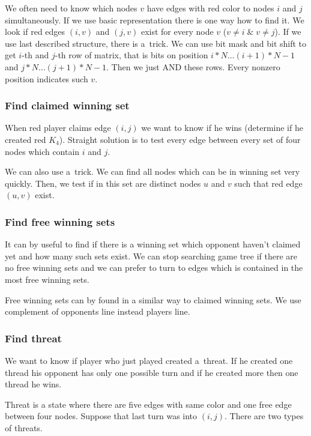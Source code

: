 We often need to know which nodes $v$ have edges with red color to nodes $i$
and $j$ simultaneously. If we use basic representation there is one way how to
find it. We look if red edges $(i,v)$ and $(j,v)$ exist for every node $v$ ($v
\ne i \; \& \; v \ne j$). If we use last described structure, there is a~trick.
We can use bit mask and bit shift to get $i$-th and $j$-th row of matrix, that
is bits on position $i*N \ldots (i\!+\!1)\!*\!N\!-\!1$ and $j*N \ldots
(j\!+\!1)\!*\!N\!-\!1 $. Then we just AND these rows. Every nonzero position
indicates such $v$.

\subsubsection{ Find claimed winning set } 

When red player claims edge $(i,j)$ we want to know if he wins (determine if he
created red $K_4$). Straight solution is to test every edge between every set
of four nodes which contain $i$ and $j$.

We can also use a~trick. We can find all nodes which can be in winning set very
quickly. Then, we test if in this set are distinct nodes $u$ and $v$ such that
red edge $(u,v)$ exist.


\subsubsection{ Find free winning sets }

It can by useful to find if there is a winning set which opponent haven't
claimed yet and how many such sets exist. We can stop searching game tree if
there are no free winning sets and we can prefer to turn to edges which is
contained in the most free winning sets.

Free winning sets can by found in a similar way to claimed winning sets. We use
complement of opponents line instead players line.

\subsubsection{ Find threat }

We want to know if player who just played created a~threat. If he created one
thread his opponent has only one possible turn and if he created more then one
thread he wins. 

Threat is a state where there are five edges with same color and one free edge
between four nodes. Suppose that last turn was into $(i,j)$. There are two
types of threats.
 
